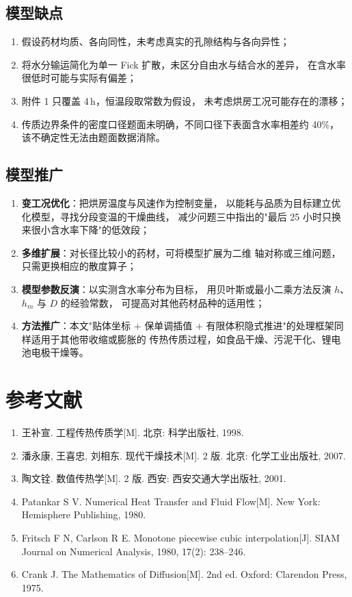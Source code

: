 \documentclass[12pt,a4paper]{ctexart}
\begin{document}
\subsection{模型缺点}

\begin{enumerate}
  \item 假设药材均质、各向同性，未考虑真实的孔隙结构与各向异性；
  \item 将水分输运简化为单一 Fick 扩散，未区分自由水与结合水的差异，
        在含水率很低时可能与实际有偏差；
  \item 附件 1 只覆盖 4\,h，恒温段取常数为假设，
        未考虑烘房工况可能存在的漂移；
  \item 传质边界条件的密度口径题面未明确，不同口径下表面含水率相差约 40\%，
        该不确定性无法由题面数据消除。
\end{enumerate}

\subsection{模型推广}

\begin{enumerate}
  \item \textbf{变工况优化}：把烘房温度与风速作为控制变量，
        以能耗与品质为目标建立优化模型，寻找分段变温的干燥曲线，
        减少问题三中指出的"最后 25 小时只换来很小含水率下降"的低效段；
  \item \textbf{多维扩展}：对长径比较小的药材，可将模型扩展为二维
        轴对称或三维问题，只需更换相应的散度算子；
  \item \textbf{模型参数反演}：以实测含水率分布为目标，
        用贝叶斯或最小二乘方法反演 $h$、$h_m$ 与 $D$ 的经验常数，
        可提高对其他药材品种的适用性；
  \item \textbf{方法推广}：本文"贴体坐标 $+$ 保单调插值 $+$
        有限体积隐式推进"的处理框架同样适用于其他带收缩或膨胀的
        传热传质过程，如食品干燥、污泥干化、锂电池电极干燥等。
\end{enumerate}

\section*{参考文献}

\begin{enumerate}
  \item[{[1]}] 王补宣. 工程传热传质学[M]. 北京: 科学出版社, 1998.
  \item[{[2]}] 潘永康, 王喜忠, 刘相东. 现代干燥技术[M]. 2 版. 北京: 化学工业出版社, 2007.
  \item[{[3]}] 陶文铨. 数值传热学[M]. 2 版. 西安: 西安交通大学出版社, 2001.
  \item[{[4]}] Patankar S V. Numerical Heat Transfer and Fluid Flow[M].
        New York: Hemisphere Publishing, 1980.
  \item[{[5]}] Fritsch F N, Carlson R E. Monotone piecewise cubic interpolation[J].
        SIAM Journal on Numerical Analysis, 1980, 17(2): 238--246.
  \item[{[6]}] Crank J. The Mathematics of Diffusion[M]. 2nd ed.
        Oxford: Clarendon Press, 1975.
\end{enumerate}
\end{document}
